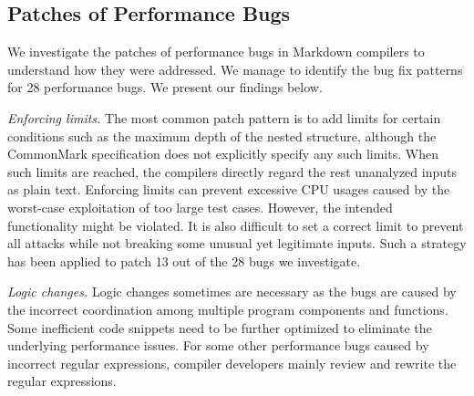 \subsection{Patches of Performance Bugs}
\label{s:study-patch}
We investigate the patches of performance bugs in Markdown compilers to understand how they were addressed.
%
We manage to identify the bug fix patterns for 28 performance bugs.
%
We present our findings below.
%

 \emph{Enforcing limits.}
%
The most common patch pattern is to add limits for certain conditions such as the maximum depth of the nested structure,
%
although the CommonMark specification does not explicitly specify any such limits.
%
%
When such limits are reached, the compilers directly regard the rest unanalyzed inputs as plain text.
%
%
%
Enforcing limits can prevent excessive CPU usages caused by the worst-case exploitation of too large test cases.
%
However, 
the intended functionality might be violated.
%
It is also difficult to set a correct limit to prevent all attacks while not breaking some unusual yet legitimate inputs.
%
%
Such a strategy has been applied to patch 13 out of the 28 bugs we investigate.

 \emph{Logic changes.}
Logic changes sometimes are necessary as the bugs are caused by the incorrect coordination among multiple program components and functions.
%
Some inefficient code snippets need to be further optimized to eliminate the underlying performance issues.
%
For some other performance bugs caused by incorrect regular expressions,
compiler developers mainly review and rewrite the regular expressions.
